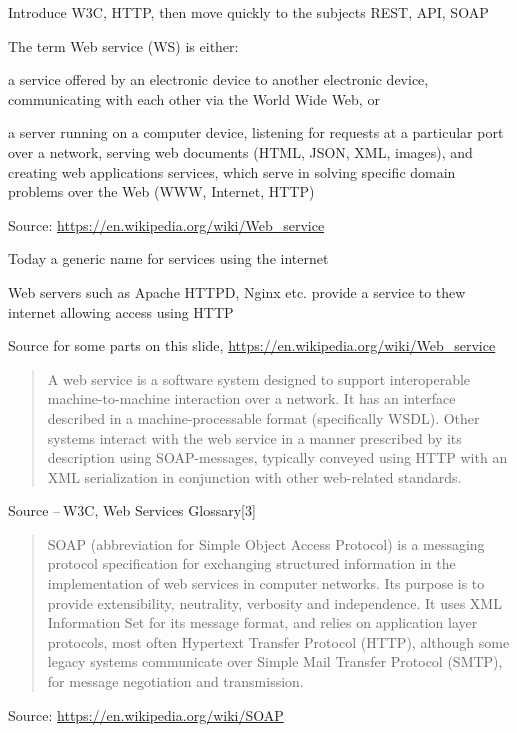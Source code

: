 \documentclass[Screen16to9,17pt]{foils}
\begin{document}

Introduce W3C, HTTP, then move quickly to the subjects REST, API, SOAP



  The term Web service (WS) is either:
  \begin{list2}
  \item  a service offered by an electronic device to another electronic device, communicating with each other via the World Wide Web, or
  \item a server running on a computer device, listening for requests at a particular port over a network, serving web documents (HTML, JSON, XML, images), and creating web applications services, which serve in solving specific domain problems over the Web (WWW, Internet, HTTP)
\end{list2}
Source: \url{https://en.wikipedia.org/wiki/Web_service}

\begin{list2}
\item Today a generic name for services using the internet
\item Web servers such as Apache HTTPD, Nginx etc. provide a service to thew internet allowing access using HTTP
\item Source for some parts on this slide, \url{https://en.wikipedia.org/wiki/Web_service}
\end{list2}





\begin{quote}
A web service is a software system designed to support interoperable machine-to-machine interaction over a network. It has an interface described in a machine-processable format (specifically WSDL). Other systems interact with the web service in a manner prescribed by its description using SOAP-messages, typically conveyed using HTTP with an XML serialization in conjunction with other web-related standards.
\end{quote}
Source -- W3C, Web Services Glossary[3]



\begin{quote}
SOAP (abbreviation for Simple Object Access Protocol) is a messaging protocol specification for exchanging structured information in the implementation of web services in computer networks. Its purpose is to provide extensibility, neutrality, verbosity and independence. It uses XML Information Set for its message format, and relies on application layer protocols, most often Hypertext Transfer Protocol (HTTP), although some legacy systems communicate over Simple Mail Transfer Protocol (SMTP), for message negotiation and transmission.
\end{quote}
Source: \url{https://en.wikipedia.org/wiki/SOAP}
\end{document}
